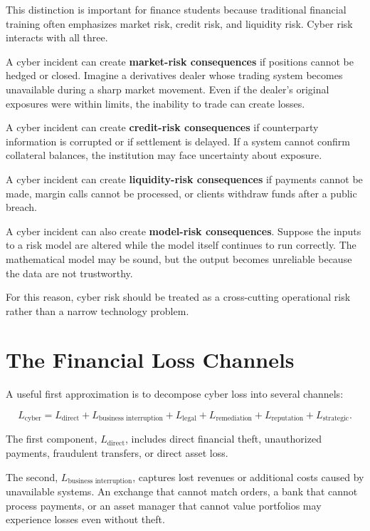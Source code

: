 This distinction is important for finance students because traditional financial training often emphasizes market risk, credit risk, and liquidity risk. Cyber risk interacts with all three.

A cyber incident can create \textbf{market-risk consequences} if positions cannot be hedged or closed. Imagine a derivatives dealer whose trading system becomes unavailable during a sharp market movement. Even if the dealer's original exposures were within limits, the inability to trade can create losses.

A cyber incident can create \textbf{credit-risk consequences} if counterparty information is corrupted or if settlement is delayed. If a system cannot confirm collateral balances, the institution may face uncertainty about exposure.

A cyber incident can create \textbf{liquidity-risk consequences} if payments cannot be made, margin calls cannot be processed, or clients withdraw funds after a public breach.

A cyber incident can also create \textbf{model-risk consequences}. Suppose the inputs to a risk model are altered while the model itself continues to run correctly. The mathematical model may be sound, but the output becomes unreliable because the data are not trustworthy.

For this reason, cyber risk should be treated as a cross-cutting operational risk rather than a narrow technology problem.

\section{The Financial Loss Channels}

A useful first approximation is to decompose cyber loss into several channels:

\begin{equation}
L_{\text{cyber}}
=
L_{\text{direct}}
+
L_{\text{business interruption}}
+
L_{\text{legal}}
+
L_{\text{remediation}}
+
L_{\text{reputation}}
+
L_{\text{strategic}}.
\end{equation}

The first component, $L_{\text{direct}}$, includes direct financial theft, unauthorized payments, fraudulent transfers, or direct asset loss.

The second, $L_{\text{business interruption}}$, captures lost revenues or additional costs caused by unavailable systems. An exchange that cannot match orders, a bank that cannot process payments, or an asset manager that cannot value portfolios may experience losses even without theft.

